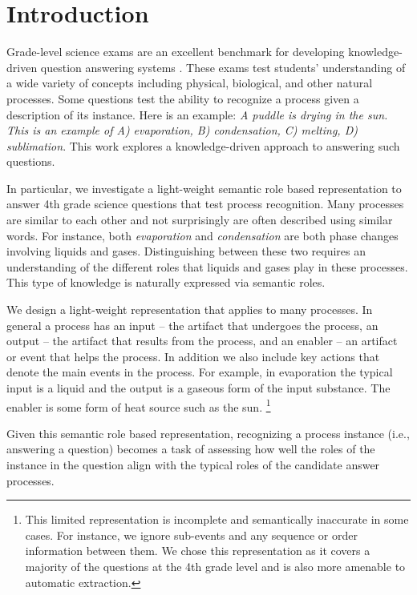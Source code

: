 \section{Introduction}

Grade-level science exams are an excellent benchmark for developing knowledge-driven question answering systems \cite{clark2013study}.
These exams test students' understanding of a wide variety of concepts including physical, biological, and other natural processes. 
Some questions test the ability to recognize a process given a description of its instance.  
Here is an example: {\em A puddle is drying in the sun. 
This is an example of A) evaporation, B) condensation, C) melting, D) sublimation}. 
This work explores a knowledge-driven approach to answering such questions. 

In particular, we investigate a light-weight semantic role based representation to 
answer 4th grade science questions that test process recognition.
Many processes are similar to each other and not surprisingly are often described using similar words. 
For instance, both {\em evaporation} and {\em condensation} are both phase changes involving liquids and gases. 
Distinguishing between these two requires an understanding of the different roles that liquids and gases play in these processes. 
This type of knowledge is naturally expressed via semantic roles.

We design a light-weight representation that applies to many processes.
In general a process has an input -- the artifact that undergoes the process, 
an output -- the artifact that results from the process, 
and an enabler -- an artifact or event that helps the process. 
In addition we also include key actions that denote the main events in the process. 
For example, in evaporation the typical input is a liquid and the output is a gaseous form of the input substance.
The enabler is some form of heat source such as the sun.
\footnote{This limited representation is incomplete and semantically inaccurate in some cases. 
For instance, we ignore sub-events and any sequence or order information between them. 
We chose this representation as it covers a majority of the questions at the 4th grade level and is also more amenable to 
automatic extraction.} 

Given this semantic role based representation, recognizing a process instance (i.e., answering a question) becomes a task of assessing how well the roles of the instance in the question align with the typical roles of the candidate answer processes. 

